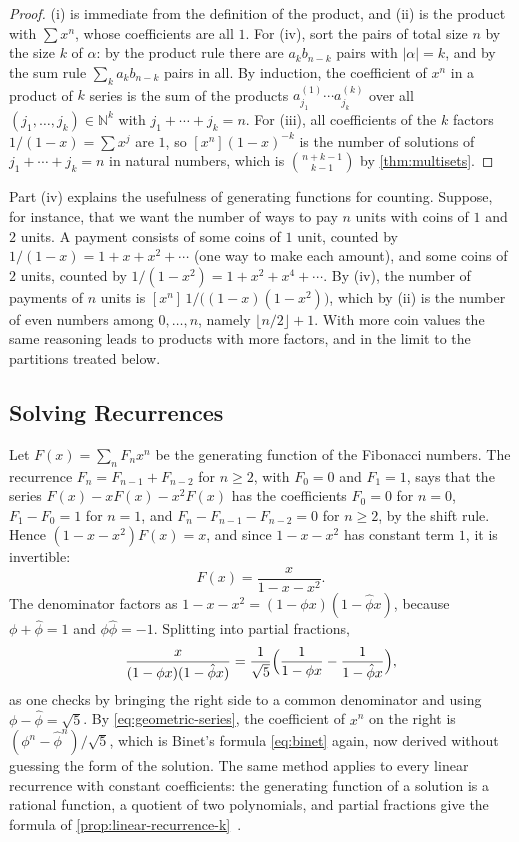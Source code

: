 \begin{proof}
(i) is immediate from the definition of the product, and (ii) is the product with $\sum x^n$, whose coefficients are all $1$. For (iv), sort the pairs of total size $n$ by the size $k$ of $\alpha$: by the product rule there are $a_kb_{n-k}$ pairs with $|\alpha|=k$, and by the sum rule $\sum_ka_kb_{n-k}$ pairs in all. By induction, the coefficient of $x^n$ in a product of $k$ series is the sum of the products $a^{(1)}_{j_1}\cdots a^{(k)}_{j_k}$ over all $(j_1,\ldots,j_k)\in\mathbb N^k$ with $j_1+\cdots+j_k=n$. For (iii), all coefficients of the $k$ factors $1/(1-x)=\sum x^j$ are $1$, so $[x^n](1-x)^{-k}$ is the number of solutions of $j_1+\cdots+j_k=n$ in natural numbers, which is $\binom{n+k-1}{k-1}$ by \cref{thm:multisets}.
\end{proof}

Part (iv) explains the usefulness of generating functions for counting. Suppose, for instance, that we want the number of ways to pay $n$ units with coins of $1$ and $2$ units. A payment consists of some coins of $1$ unit, counted by $1/(1-x)=1+x+x^2+\cdots$ (one way to make each amount), and some coins of $2$ units, counted by $1/(1-x^2)=1+x^2+x^4+\cdots$. By (iv), the number of payments of $n$ units is $[x^n]\,1/\bigl((1-x)(1-x^2)\bigr)$, which by (ii) is the number of even numbers among $0,\ldots,n$, namely $\lfloor n/2\rfloor+1$. With more coin values the same reasoning leads to products with more factors, and in the limit to the partitions treated below.

\subsection{Solving Recurrences}

Let $F(x)=\sum_nF_nx^n$ be the generating function of the Fibonacci numbers. The recurrence $F_n=F_{n-1}+F_{n-2}$ for $n\ge2$, with $F_0=0$ and $F_1=1$, says that the series $F(x)-xF(x)-x^2F(x)$ has the coefficients $F_0=0$ for $n=0$, $F_1-F_0=1$ for $n=1$, and $F_n-F_{n-1}-F_{n-2}=0$ for $n\ge2$, by the shift rule. Hence $(1-x-x^2)F(x)=x$, and since $1-x-x^2$ has constant term $1$, it is invertible:
\[
F(x)=\frac{x}{1-x-x^2}.
\]
The denominator factors as $1-x-x^2=(1-\phi x)(1-\hat\phi x)$, because $\phi+\hat\phi=1$ and $\phi\hat\phi=-1$. Splitting into partial fractions,
\[
\frac{x}{(1-\phi x)(1-\hat\phi x)}=\frac1{\sqrt5}\Bigl(\frac1{1-\phi x}-\frac1{1-\hat\phi x}\Bigr),
\]
as one checks by bringing the right side to a common denominator and using $\phi-\hat\phi=\sqrt5$. By \eqref{eq:geometric-series}, the coefficient of $x^n$ on the right is $(\phi^n-\hat\phi^n)/\sqrt5$, which is Binet's formula \eqref{eq:binet} again, now derived without guessing the form of the solution. The same method applies to every linear recurrence with constant coefficients: the generating function of a solution is a rational function, a quotient of two polynomials, and partial fractions give the formula of \cref{prop:linear-recurrence-k}~\cite[Sect.~7.3]{graham1994concrete}.

